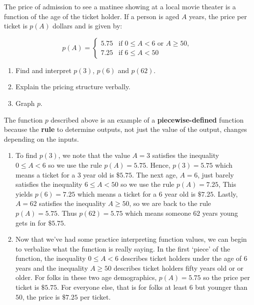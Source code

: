 \documentclass{ximera}
\begin{document}
\begin{example} \label{piecewiseconstantex}  The price of admission to see a matinee showing at a local movie theater is a function of the age  of the ticket holder.  If a person is aged $A$ years, the price per ticket is $p(A)$ dollars and is given by:

\[
p(A) = \begin{cases} 
        5.75 & \text{if $0 \leq A < 6$ or $A \geq 50$}, \\ 
        7.25 & \text{if $6 \leq A < 50$} 
      \end{cases}
\]

\begin{enumerate}

\item Find and interpret $p(3)$, $p(6)$ and $p(62)$.

\item Explain the pricing structure verbally.

\item Graph $p$.

\end{enumerate}

\begin{explanation}  The function $p$ described above is an example of a  \textbf{piecewise-defined} function because the \textbf{rule} to determine outputs, not just the value of the output,  changes depending on the inputs.

\begin{enumerate}

\item To find $p(3)$, we note that the value $A = 3$ satisfies the inequality $0 \leq A < 6$ so we use the rule $p(A) = 5.75$.  Hence, $p(3) = 5.75$ which means a ticket for a $3$ year old is $\$ 5.75$.  The next age, $A = 6$, just barely satisfies the inequality $6 \leq A < 50$ so we use the rule $p(A) = 7.25$, This yields $p(6) = 7.25$ which means a ticket for a $6$ year old is $\$ 7.25$.  Lastly, $A = 62$ satisfies the inequality $A \geq 50$, so we are back to the rule $p(A) = 5.75$.  Thus $p(62) = 5.75$ which means someone $62$ years young gets in for $\$ 5.75$.

\item  Now that we've had some practice interpreting function values, we can begin to verbalize what the function is really saying.  In the first `piece' of the function, the inequality $0 \leq A < 6$  describes ticket holders under the age of 6 years and  the inequality $A \geq 50$ describes ticket holders fifty years old or or older.  For  folks in these two age demographics, $p(A) = 5.75$ so the price per ticket is $\$ 5.75$.  For everyone else, that is for folks at least $6$ but younger than $50$, the price is $\$7.25$ per ticket.


\end{enumerate}
\end{explanation}
\end{example}
\end{document}
